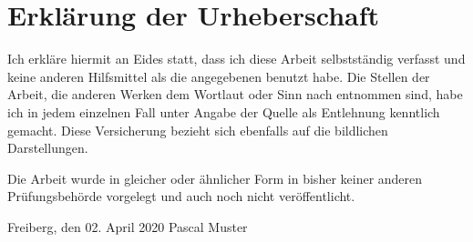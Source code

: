 \chapter*{Erklärung der Urheberschaft}
Ich erkläre hiermit an Eides statt, dass ich diese Arbeit selbstständig 
verfasst und keine anderen Hilfsmittel als die angegebenen benutzt habe. Die Stellen der 
Arbeit, die anderen Werken dem Wortlaut oder Sinn nach entnommen sind, habe ich in jedem 
einzelnen Fall unter Angabe der Quelle als Entlehnung kenntlich gemacht. Diese 
Versicherung bezieht sich ebenfalls auf die bildlichen Darstellungen.

Die Arbeit wurde in gleicher oder ähnlicher Form in bisher keiner anderen 
Prüfungsbehörde vorgelegt und auch noch nicht 
veröffentlicht.

\vspace{4cm}

\hspace{0pt} Freiberg, den 02. April 2020  \hfill Pascal Muster \hspace{1cm}